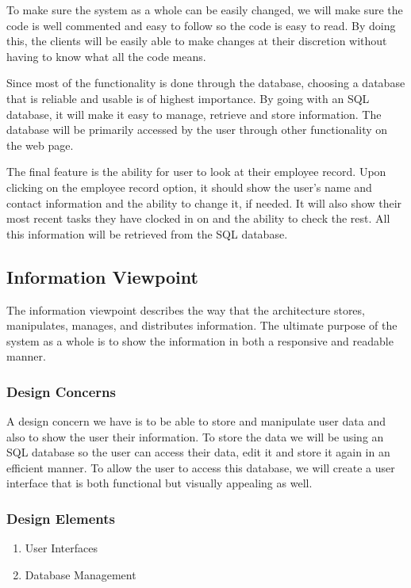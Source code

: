 \documentclass[letterpaper,10pt,titlepage,journal,compsoc,draftclsnofoot,onecolumn]{IEEEtran}
\begin{document}
To make sure the system as a whole can be easily changed, we will make sure the code is well commented and easy to follow so the code is easy to read. By doing this, the clients will be easily able to make changes at their discretion without having to know what all the code means. 


Since most of the functionality is done through the database, choosing a database that is reliable and usable is of highest importance. By going with an SQL database, it will make it easy to manage, retrieve and store information. The database will be primarily accessed by the user through other functionality on the web page. 


The final feature is the ability for user to look at their employee record. Upon clicking on the employee record option, it should show the user's name and contact information and the ability to change it, if needed. It will also show their most recent tasks they have clocked in on and the ability to check the rest. All this information will be retrieved from the SQL database.

\subsection{Information Viewpoint}

The information viewpoint describes the way that the architecture stores, manipulates, manages, and distributes information. The ultimate purpose of the system as a whole is to show the information in both a responsive and readable manner. 

\subsubsection{Design Concerns}

A design concern we have is to be able to store and manipulate user data and also to show the user their information. To store the data we will be using an SQL database so the user can access their data, edit it and store it again in an efficient manner. To allow the user to access this database, we will create a user interface that is both functional but visually appealing as well.

\subsubsection{Design Elements}

\begin{enumerate}

\item{User Interfaces}
\item{Database Management}
\end{enumerate}
\end{document}

